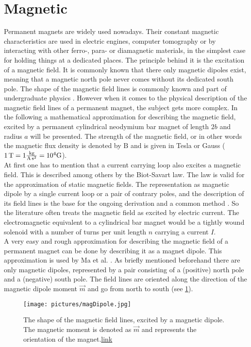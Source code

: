 \section{Magnetic} \label{sec:magneticFound}
Permanent magnets are widely used nowadays. Their constant magnetic characteristics are used in electric engines, computer tomography or by interacting with other ferro-, para- or diamagnetic materials, in the simplest case for holding things at a dedicated places. The principle behind it is the excitation of a magnetic field. It is commonly known that there only magnetic dipoles exist, meaning that a magnetic north pole never comes without its dedicated south pole. The shape of the magnetic field lines is commonly known and part of undergraduate physics . However when it comes to the physical description of the magnetic field lines of a permanent magnet, the subject gets more complex. In the following a mathematical approximation for describing the magnetic field, excited by a permanent cylindrical neodymium bar magnet of length $ 2b $ and radius $ a $ will be presented. The strength of the magnetic field, or in other words the magnetic flux density is denoted by $ \mathrm{B} $ and is given in Tesla or Gauss ($ \SI{1}{\tesla} = 1 \si[per-mode=fraction]{\kilogram \per \ampere \per \second \squared} = 10^{4} \mathrm{G}$).\\
At first one has to mention that a current carrying loop also excites a magnetic field. This is described among others by the Biot-Savart law. The law is valid for the approximation of static magnetic fields. The representation as magnetic dipole by a single current loop or a pair of contrary poles, and the description of its field lines is the base for the ongoing derivation and a common method \cite{derby2010cylindrical}. So the literature often treats the magnetic field as excited by electric current. The electromagnetic equivalent to a cylindrical bar magnet would be a tightly wound solenoid with a number of turns per unit length $ n $ carrying a current $ I $.\\
A very easy and rough approximation for describing the magnetic field of a permanent magnet can be done by describing it as a magnet dipole. This approximation is used by Ma et al. \cite{ma2010magnetic}. As briefly mentioned beforehand there are only magnetic dipoles, represented by a pair consisting of a (positive) north pole and a (negative) south pole. The field lines are oriented along the direction of the magnetic dipole moment $ \vec{m} $ and go from north to south (see \ref{fig:magDipole}). %
\begin{figure}
\centering
\label{fig:magDipole}
\texttt{[image: pictures/magDipole.jpg]}
\caption{The shape of the magnetic field lines, excited by a magnetic dipole. The magnetic moment is denoted as $ \vec{m} $ and represents the orientation of the magnet.\href{http://cdn1.askiitians.com/Images/201529-161356533-148-download.jpg}{link}}
\end{figure}

